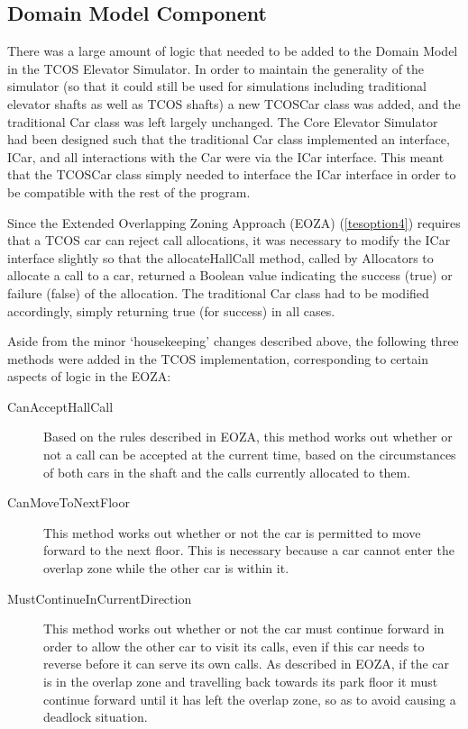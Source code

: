 \documentclass{UoYCSproject}
\begin{document}
\subsection{Domain Model Component}

There was a large amount of logic that needed to be added to the Domain Model in the TCOS Elevator Simulator.  In order to maintain the generality of the simulator (so that it could still be used for simulations including traditional elevator shafts as well as TCOS shafts) a new TCOSCar class was added, and the traditional Car class was left largely unchanged.  The Core Elevator Simulator had been designed such that the traditional Car class implemented an interface, ICar, and all interactions with the Car were via the ICar interface.  This meant that the TCOSCar class simply needed to interface the ICar interface in order to be compatible with the rest of the program.

Since the Extended Overlapping Zoning Approach (EOZA) (\autoref{tesoption4}) requires that a TCOS car can reject call allocations, it was necessary to modify the ICar interface slightly so that the allocateHallCall method, called by Allocators to allocate a call to a car, returned a Boolean value indicating the success (true) or failure (false) of the allocation.  The traditional Car class had to be modified accordingly, simply returning true (for success) in all cases.

Aside from the minor `housekeeping' changes described above, the following three methods were added in the TCOS implementation, corresponding to certain aspects of logic in the EOZA:
	\begin{description}
		\item[CanAcceptHallCall] Based on the rules described in EOZA, this method works out whether or not a call can be accepted at the current time, based on the circumstances of both cars in the shaft and the calls currently allocated to them.
		\item[CanMoveToNextFloor] This method works out whether or not the car is permitted to move forward to the next floor.  This is necessary because a car cannot enter the overlap zone while the other car is within it.
		\item[MustContinueInCurrentDirection] This method works out whether or not the car must continue forward in order to allow the other car to visit its calls, even if this car needs to reverse before it can serve its own calls.  As described in EOZA, if the car is in the overlap zone and travelling back towards its park floor it must continue forward until it has left the overlap zone, so as to avoid causing a deadlock situation.
	\end{description}
	
\end{document}
